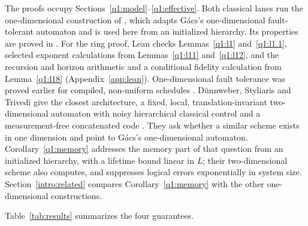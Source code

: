 The proofs occupy Sections~\ref{q1:model}--\ref{q1:effective}. Both classical lanes run the one-dimensional construction of \cite{DMNoise1D2026}, which adapts G\'acs's one-dimensional fault-tolerant automaton \cite{Gacs1986} and is used here from an initialized hierarchy. Its properties are proved in \cite{DMNoise1D2026}. For the ring proof,
Lean checks Lemmas~\ref{q1:l1} and~\ref{q1:l1.1}, selected exponent
calculations from Lemmas~\ref{q1:l11} and~\ref{q1:l12}, and the
recursion and horizon arithmetic and a conditional fidelity calculation
from Lemma~\ref{q1:l18} (Appendix~\ref{app:lean}).
One-dimensional fault tolerance was proved earlier for compiled, non-uniform schedules \cite{ABO2008,Gottesman2000,GB2025}. D\"unnweber, Styliaris and Trivedi give the closest architecture, a fixed, local, translation-invariant two-dimensional automaton with noisy hierarchical classical control and a measurement-free concatenated code \cite{DST2026}. They ask whether a similar scheme exists in one dimension and point to G\'acs's one-dimensional automaton. Corollary~\ref{q1:memory} addresses the memory part of that question from an initialized hierarchy, with a lifetime bound linear in \(L\); their two-dimensional scheme also computes, and suppresses logical errors exponentially in system size. Section~\ref{intro:related} compares Corollary~\ref{q1:memory} with the other one-dimensional constructions.

Table~\ref{tab:results} summarizes the four guarantees.


